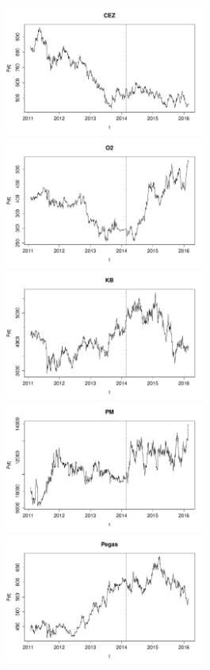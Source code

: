 \documentclass[a4paper,12pt]{report}
\theoremstyle{definition} \newtheorem{definice}[veta]{Definice}
\theoremstyle{remark}
\begin{document}
\begin{figure}[!htbp]
  \centering 
	\includegraphics[width=6.6cm, clip, trim= 0 15 25 0]{IMG/ds_cez_v4.pdf}\quad
	\includegraphics[width=6.6cm, clip, trim= 0 15 25 0]{IMG/ds_o2_v4.pdf}\\	
	\includegraphics[width=6.6cm, clip, trim= 0 15 25 0]{IMG/ds_KB_v4.pdf}\quad
	\includegraphics[width=6.6cm, clip, trim= 0 15 25 0]{IMG/ds_PM_v4.pdf}\\	
	\includegraphics[width=6.6cm, clip, trim= 0 15 25 0]{IMG/ds_Pegas_v4.pdf}\quad

\end{figure}
\end{document}
